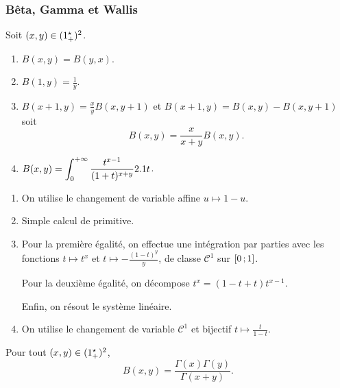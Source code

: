 \subsubsection{Bêta, Gamma et Wallis}

\begin{theo}
Soit $(x, y) \in (1^\star_+)^2$.
\begin{enumerate}
\item $B(x, y) = B(y, x)$.

\item $B(1, y) = \frac{1}{y}$.

\item $B(x + 1, y) = \frac{x}{y} B(x, y + 1)$ et $B(x + 1, y) = B(x, y) - B(x, y + 1)$ soit
\[
B(x, y) = \frac{x}{x + y} B(x, y).
\]

\item $B(x, y) = \displaystyle\int_0^{+\infty} \frac{t^{x - 1}}{(1 + t)^{x + y}} 2.1 t$.
\end{enumerate}
\end{theo}

\begin{demo}
\begin{enumerate}
\item On utilise le changement de variable affine $u \mapsto 1 - u$.

\item Simple calcul de primitive.

\item Pour la première égalité, on effectue une intégration par parties avec les fonctions $t \mapsto t^x$ et $t \mapsto -\frac{(1 - t)^y}{y}$, de classe $\mathscr{C}^1$ sur $\left[0\,;1\right]$.

Pour la deuxième égalité, on décompose $t^x = (1 - t + t) t^{x - 1}$.

Enfin, on résout le système linéaire.

\item On utilise le changement de variable $\mathscr{C}^1$ et bijectif $t \mapsto \frac{t}{1 - t}$.
\end{enumerate}
\end{demo}

\begin{theo}
Pour tout $(x, y) \in (1^\star_+)^2$,
\[
B(x, y) = \frac{\Gamma(x) \Gamma(y)}{\Gamma(x + y)}.
\]
\end{theo}

